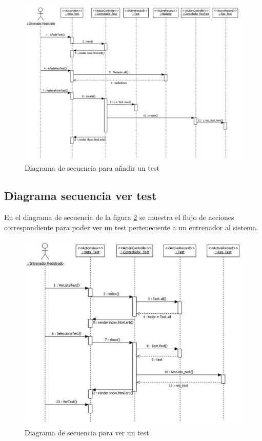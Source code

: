 		  \begin{figure}[H]
			  \centering
			    \includegraphics[width=15cm]{./eps/di_diagsecuencia/Test_Anadir.eps}
			  \caption{Diagrama de secuencia para añadir un test}
			  \label{fig:di_sec_anadirtest}
			\end{figure}
			
			\newpage
		
		\subsection{Diagrama secuencia ver test} %
		  \label{sub:diagrama_secuencia_ver_test}
		  
		  En el diagrama de secuencia de la figura \ref{fig:di_sec_vertest} se muestra el flujo de acciones correspondiente para poder ver un test perteneciente a un entrenador al sistema.
		  
		  \begin{figure}[H]
			  \centering
			    \includegraphics[width=15cm]{./eps/di_diagsecuencia/Test_Ver.eps}
			  \caption{Diagrama de secuencia para ver un test}
			  \label{fig:di_sec_vertest}
			\end{figure}
		
